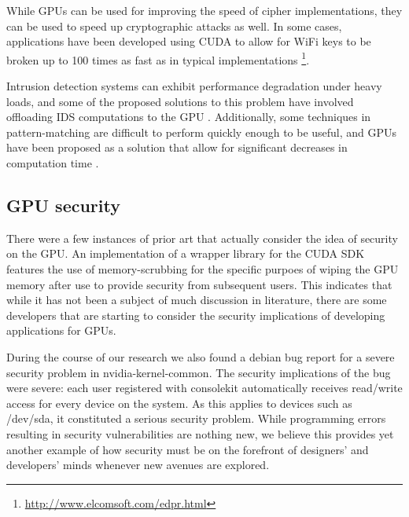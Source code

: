 \documentclass[letterpaper,10pt]{article}
\begin{document}
\begin{multicols}{2}
  While GPUs can be used for improving the speed of cipher implementations, they can be used to speed up cryptographic attacks as well. In some cases, applications have been developed using CUDA to allow for WiFi keys to be broken up to 100 times as fast as in typical implementations \footnote{\url{http://www.elcomsoft.com/edpr.html}}.
  
  Intrusion detection systems can exhibit performance degradation under heavy
  loads, and some of the proposed solutions to this problem have involved
  offloading IDS computations to the GPU
  \cite{offloadids}.
  Additionally, some techniques in pattern-matching are difficult to perform
  quickly enough to be useful, and GPUs have been proposed as a solution that
  allow for significant decreases in computation time
  \cite{gpuids}.

\subsection{GPU security}
 There were a few instances of prior art that actually consider the idea of security on the GPU.  An implementation of a wrapper library for the CUDA SDK features the use of memory-scrubbing for the specific purpoes of wiping the GPU memory after use to provide security from subsequent users\cite{cudawrapper}.  This indicates that while it has not been a subject of much discussion in literature, there are some developers that are starting to consider the security implications of developing applications for GPUs.
 
 During the course of our research we also found a debian bug report for a severe security problem in nvidia-kernel-common\cite{bugreport}.  The security implications of the bug were severe: each user registered with consolekit automatically receives read/write access for every device on the system.  As this applies to devices such as /dev/sda, it constituted a serious security problem.  While programming errors resulting in security vulnerabilities are nothing new, we believe this provides yet another example of how security must be on the forefront of designers' and developers' minds whenever new avenues are explored.


\end{multicols}
\end{document}
